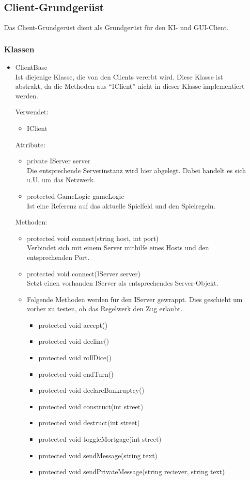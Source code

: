 \documentclass[a4paper,10pt]{article}
\begin{document}
\subsection{Client-Grundgerüst}
Das Client-Grundgerüst dient als Grundgerüst für den KI- und GUI-Client.
\subsubsection{Klassen}
\begin{itemize}
\item ClientBase\\
Ist diejenige Klasse, die von den Clients vererbt wird. Diese Klasse ist abstrakt, da die Methoden aus "`IClient"' nicht in dieser Klasse implementiert werden.

Verwendet:
\begin{itemize}
\item IClient
\end{itemize}
Attribute:
\begin{itemize}
\item private IServer server \\
Die entsprechende Serverinstanz wird hier abgelegt. Dabei handelt es sich u.U. um das Netzwerk.
\item protected GameLogic gameLogic \\
Ist eine Referenz auf das aktuelle Spielfeld und den Spielregeln.
\end{itemize}
Methoden:

\begin{itemize}
\item protected void connect(string host, int port) \\
Verbindet sich mit einem Server mithilfe eines Hosts und den entsprechenden Port.
\item protected void connect(IServer server) \\
Setzt einen vorhanden IServer als entsprechendes Server-Objekt.
\item Folgende Methoden werden für den IServer gewrappt. Dies geschieht um vorher zu testen, ob das Regelwerk den Zug erlaubt.
\begin{itemize}
\item protected void accept()
\item protected void decline()
\item protected void rollDice()
\item protected void endTurn()
\item protected void declareBankruptcy()
\item protected void construct(int street)
\item protected void destruct(int street)
\item protected void toggleMortgage(int street)
\item protected void sendMessage(string text)
\item protected void sendPrivateMessage(string reciever, string text)
\end{itemize}
\end{itemize} %
\end{itemize} %
\end{document}

